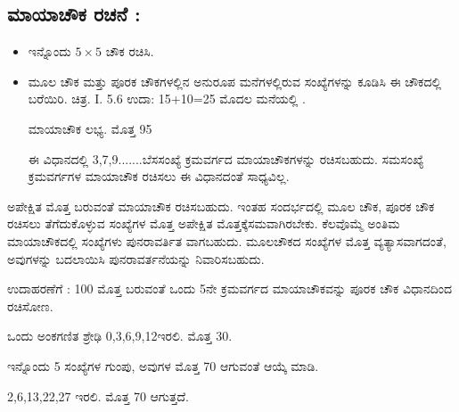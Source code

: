 \newpage

\subsection*{ಮಾಯಾಚೌಕ ರಚನೆ :}

\begin{itemize}
	\item ಇನ್ನೊಂದು $5 \times 5$ ಚೌಕ ರಚಿಸಿ.
	\item ಮೂಲ ಚೌಕ ಮತ್ತು ಪೂರಕ ಚೌಕಗಳಲ್ಲಿನ ಅನುರೂಪ ಮನೆಗಳಲ್ಲಿರುವ ಸಂಖ್ಯೆ\-ಗಳನ್ನು ಕೂಡಿಸಿ ಈ ಚೌಕದಲ್ಲಿ ಬರೆಯಿರಿ. ಚಿತ್ರ. I. 5.6
	ಉದಾ: 15+10=25 ಮೊದಲ ಮನೆಯಲ್ಲಿ .

	ಮಾಯಾಚೌಕ ಲಭ್ಯ. ಮೊತ್ತ 95

	ಈ ವಿಧಾನದಲ್ಲಿ 3,7,9.......ಬೆಸಸಂಖ್ಯೆ ಕ್ರಮವರ್ಗದ ಮಾಯಾಚೌಕಗಳನ್ನು ರಚಿಸ\-ಬಹುದು. ಸಮಸಂಖ್ಯೆ ಕ್ರಮವರ್ಗಗಳ ಮಾಯಾಚೌಕ ರಚಿಸಲು ಈ ವಿಧಾನದಂತೆ ಸಾಧ್ಯವಿಲ್ಲ.
\end{itemize}

ಅಪೇಕ್ಷಿತ ಮೊತ್ತ ಬರುವಂತೆ ಮಾಯಾಚೌಕ ರಚಿಸಬಹುದು. ಇಂತಹ ಸಂದರ್ಭದಲ್ಲಿ ಮೂಲ ಚೌಕ, ಪೂರಕ ಚೌಕ ರಚಿಸಲು ತೆಗೆದುಕೊಳ್ಳುವ ಸಂಖ್ಯೆಗಳ ಮೊತ್ತ ಅಪೇಕ್ಷಿತ ಮೊತ್ತಕ್ಕೆ\break ಸಮವಾಗಿರಬೇಕು. ಕೆಲವೊಮ್ಮೆ ಅಂತಿಮ ಮಾಯಾಚೌಕದಲ್ಲಿ ಸಂಖ್ಯೆಗಳು ಪುನರಾವರ್ತಿತ ವಾಗಬಹುದು. ಮೂಲಚೌಕದ ಸಂಖ್ಯೆಗಳ ಮೊತ್ತ ವ್ಯತ್ಯಾಸವಾಗದಂತೆ, ಅವುಗಳನ್ನು ಬದ\-ಲಾಯಿಸಿ ಪುನರಾವರ್ತನೆಯನ್ನು ನಿವಾರಿಸಬಹುದು.

ಉದಾಹರಣೆಗೆ : 100 ಮೊತ್ತ ಬರುವಂತೆ ಒಂದು 5ನೇ ಕ್ರಮವರ್ಗದ ಮಾಯಾಚೌಕ\-ವನ್ನು ಪೂರಕ ಚೌಕ ವಿಧಾನದಿಂದ ರಚಿಸೋಣ.

ಒಂದು ಅಂಕಗಣಿತ ಶ್ರೇಢಿ 0,3,6,9,12ಇರಲಿ. ಮೊತ್ತ 30.

ಇನ್ನೊಂದು 5 ಸಂಖ್ಯೆಗಳ ಗುಂಪು, ಅವುಗಳ ಮೊತ್ತ 70 ಆಗುವಂತೆ ಆಯ್ಕೆ ಮಾಡಿ.

2,6,13,22,27 ಇರಲಿ. ಮೊತ್ತ 70 ಆಗುತ್ತದೆ.

